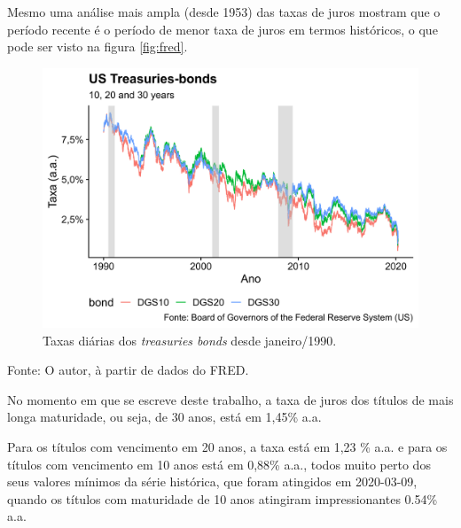 \documentclass[
	12pt,				%
	oneside,			%
	a4paper,			%
	chapter=TITLE,		%
	section=TITLE,		%
	english,			%
	brazil				%
	]{abntex2}
\newcommand{\bcenter}{\begin{center}}
\newcommand{\ecenter}{\end{center}}
\begin{document}
Mesmo uma análise mais ampla (desde 1953) das taxas de juros mostram que o
período recente é o período de menor taxa de juros em termos históricos, o que
pode ser visto na figura \ref{fig:fred}.
\begin{figure}[H]

{\centering \includegraphics[width=0.7\linewidth]{images/yields2-1} 

}

\caption{Taxas diárias dos \emph{treasuries bonds} desde janeiro/1990.}\label{fig:yields2}
\end{figure}
\bcenter

Fonte: O autor, à partir de dados do \gls{FRED}.
\ecenter

No momento em que se escreve deste trabalho, a taxa de juros dos títulos de mais
longa maturidade, ou seja, de 30 anos, está em 1,45\% a.a.

Para os títulos com vencimento em 20 anos, a taxa está em 1,23
\% a.a. e para os títulos com vencimento em 10 anos está em 0,88\% a.a.,
todos muito perto dos seus valores mínimos da série histórica, que foram
atingidos em 2020-03-09, quando os títulos
com maturidade de 10 anos atingiram impressionantes 0.54\% a.a.
\end{document}
